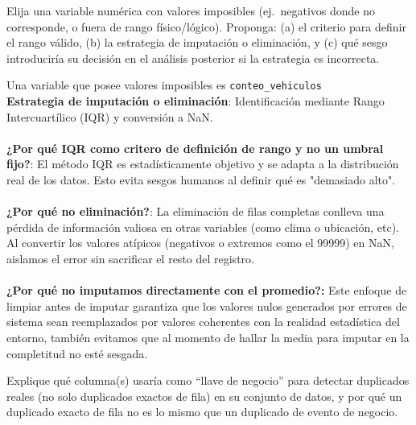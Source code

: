 \documentclass[11pt]{article}
\begin{document}
\begin{pregunta}
Elija una variable numérica con valores imposibles (ej.\ negativos donde no corresponde, o fuera de rango físico/lógico). Proponga: (a) el criterio para definir el rango válido, (b) la estrategia de imputación o eliminación, y (c) qué sesgo introduciría su decisión en el análisis posterior si la estrategia es incorrecta.
\end{pregunta}

Una variable que posee valores imposibles es \verb|conteo_vehiculos|\\

\textbf{Estrategia de imputación o eliminación}: Identificación mediante Rango Intercuartílico (IQR) y conversión a NaN.\\\\
\textbf{¿Por qué IQR como critero de definición de rango y no un umbral fijo?}: El método IQR es estadísticamente objetivo y se adapta a la distribución real de los datos. Esto evita sesgos humanos al definir qué es "demasiado alto".\\\\
\textbf{¿Por qué no eliminación?}: La eliminación de filas completas conlleva una pérdida de información valiosa en otras variables (como clima o ubicación, etc). Al convertir los valores atípicos (negativos o extremos como el 99999) en NaN, aislamos el error sin sacrificar el resto del registro.\\\\
\textbf{¿Por qué no imputamos directamente con el promedio?:} Este enfoque de limpiar antes de imputar garantiza que los valores nulos generados por errores de sistema sean reemplazados por valores coherentes con la realidad estadística del entorno, también evitamos que al momento de hallar la media para imputar en la completitud no esté sesgada.

\begin{pregunta}
Explique qué columna(s) usaría como ``llave de negocio'' para detectar duplicados reales (no solo duplicados exactos de fila) en su conjunto de datos, y por qué un duplicado exacto de fila no es lo mismo que un duplicado de evento de negocio.
\end{pregunta}\\
\end{document}
